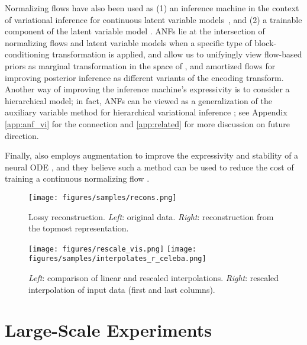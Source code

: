 \documentclass{article}
\begin{document}
Normalizing flows have also been used as (1) an inference machine in the context of variational inference for continuous latent variable models~\citep{kingma2016improved,tomczak2016improving,berg2018sylvester}, and (2) a trainable component of the latent variable model \citep{chen2016variational,agrawal2016deep,huang2017learnable}.
ANFs lie at the intersection of normalizing flows and latent variable models when a specific type of block-conditioning transformation is applied, and allow us to 
unifyingly view
flow-based priors as marginal transformation in the space of , and amortized flows for improving posterior inference as different variants of the encoding transform. 
Another way of improving the inference machine's expressivity is to consider a hierarchical model; in fact, ANFs can be viewed as a generalization of the auxiliary variable method for hierarchical variational inference \citep{agakov2004auxiliary,ranganath2016hierarchical}; see Appendix \ref{app:anf_vi} for the connection and \ref{app:related} for more discussion on future direction. 

Finally, \citet{dupont2019augmented} also employs augmentation to improve the expressivity and stability of a neural ODE \citep{chen2018neural}, and they believe such a method can be used to reduce the cost of training a continuous normalizing flow \citep{grathwohl2018ffjord}.

\begin{figure}
    \centering
    \texttt{[image: figures/samples/recons.png]}
    \caption{Lossy reconstruction. \emph{Left}: original data. \emph{Right}: reconstruction from the topmost representation.}
    \label{fig:recon}
\end{figure}



\begin{figure*}
    \centering
    \texttt{[image: figures/rescale\_vis.png]}
    \hfill
    \texttt{[image: figures/samples/interpolates\_r\_celeba.png]}
    \caption{\emph{Left}: comparison of linear and rescaled interpolations. \emph{Right}: rescaled interpolation of input data (first and last columns).}
    \label{fig:interpolate}
\end{figure*}



\section{Large-Scale Experiments}
\end{document}
